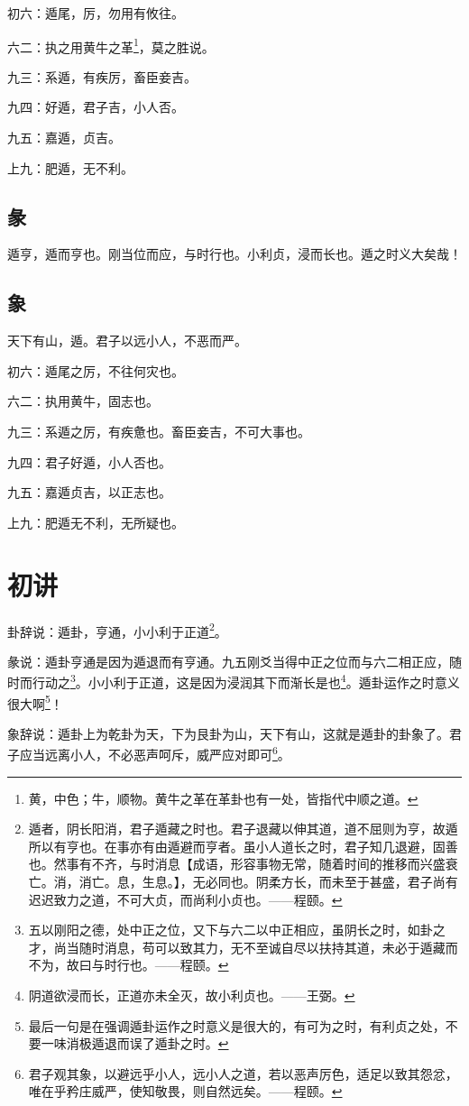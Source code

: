 \documentclass[12pt,oneside]{book}
\begin{document}
初六：遁尾，厉，勿用有攸往。

六二：执之用黄牛之革\footnote{黄，中色；牛，顺物。黄牛之革在革卦也有一处，皆指代中顺之道。}，莫之胜说。

九三：系遁，有疾厉，畜臣妾吉。

九四：好遁，君子吉，小人否。

九五：嘉遁，贞吉。

上九：肥遁，无不利。

\subsection{彖}
遁亨，遁而亨也。刚当位而应，与时行也。小利贞，浸而长也。遁之时义大矣哉！

\subsection{象}
天下有山，遁。君子以远小人，不恶而严。

初六：遁尾之厉，不往何灾也。

六二：执用黄牛，固志也。

九三：系遁之厉，有疾惫也。畜臣妾吉，不可大事也。

九四：君子好遁，小人否也。

九五：嘉遁贞吉，以正志也。

上九：肥遁无不利，无所疑也。

\section{初讲}
卦辞说：遁卦，亨通，小小利于正道\footnote{遁者，阴长阳消，君子遁藏之时也。君子退藏以伸其道，道不屈则为亨，故遁所以有亨也。在事亦有由遁避而亨者。虽小人道长之时，君子知几退避，固善也。然事有不齐，与时消息【成语，形容事物无常，随着时间的推移而兴盛衰亡。消，消亡。息，生息。】，无必同也。阴柔方长，而未至于甚盛，君子尚有迟迟致力之道，不可大贞，而尚利小贞也。——程颐。}。

彖说：遁卦亨通是因为遁退而有亨通。九五刚爻当得中正之位而与六二相正应，随时而行动之\footnote{五以刚阳之德，处中正之位，又下与六二以中正相应，虽阴长之时，如卦之才，尚当随时消息，苟可以致其力，无不至诚自尽以扶持其道，未必于遁藏而不为，故曰与时行也。——程颐。}。小小利于正道，这是因为浸润其下而渐长是也\footnote{阴道欲浸而长，正道亦未全灭，故小利贞也。——王弼。}。遁卦运作之时意义很大啊\footnote{最后一句是在强调遁卦运作之时意义是很大的，有可为之时，有利贞之处，不要一味消极遁退而误了遁卦之时。}！

象辞说：遁卦上为乾卦为天，下为艮卦为山，天下有山，这就是遁卦的卦象了。君子应当远离小人，不必恶声呵斥，威严应对即可\footnote{君子观其象，以避远乎小人，远小人之道，若以恶声厉色，适足以致其怨忿，唯在乎矜庄威严，使知敬畏，则自然远矣。——程颐。}。
\end{document}

